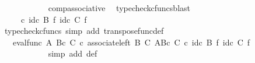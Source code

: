 \begin{isabellebody}
\ \ \ \ \ \ \ \ \ \ \isamarkupfalse%
\ comp{\isacharunderscore}{\kern0pt}associative{}\ \isamarkupfalse%
\ {\isacharparenleft}{\kern0pt}typecheck{\isacharunderscore}{\kern0pt}cfuncs{\isacharcomma}{\kern0pt}blast{\isacharparenright}{\kern0pt}\isanewline
\ \ \ \ \ \ \ \ \isamarkupfalse%
\ \isamarkupfalse%
\ {\isachardoublequoteopen}{\isachardot}{\kern0pt}{\isachardot}{\kern0pt}{\isachardot}{\kern0pt}\ {\isacharequal}{\kern0pt}\ {\isasymphi}\ \ {\isasymcirc}\isactrlsub c\ {\isacharparenleft}{\kern0pt}id\isactrlsub c\ B\ {\isasymtimes}\isactrlsub f\ {\isacharparenleft}{\kern0pt}id\isactrlsub c\ C\ {\isasymtimes}\isactrlsub f\ {\isasympsi}\isactrlsup {\isasymsharp}{\isacharparenright}{\kern0pt}{\isacharparenright}{\kern0pt}{\isachardoublequoteclose}\isanewline
\ \ \ \ \ \ \ \ \ \ \isamarkupfalse%
\ {\isacharparenleft}{\kern0pt}typecheck{\isacharunderscore}{\kern0pt}cfuncs{\isacharcomma}{\kern0pt}\ simp\ add{\isacharcolon}{\kern0pt}\ transpose{\isacharunderscore}{\kern0pt}func{\isacharunderscore}{\kern0pt}def{\isacharparenright}{\kern0pt}\isanewline
\ \ \ \ \ \ \ \ \isamarkupfalse%
\ \isamarkupfalse%
\ {\isachardoublequoteopen}{\isachardot}{\kern0pt}{\isachardot}{\kern0pt}{\isachardot}{\kern0pt}\ {\isacharequal}{\kern0pt}\ {\isacharparenleft}{\kern0pt}{\isacharparenleft}{\kern0pt}eval{\isacharunderscore}{\kern0pt}func\ A\ {\isacharparenleft}{\kern0pt}B{\isasymtimes}\isactrlsub c\ C{\isacharparenright}{\kern0pt}{\isacharparenright}{\kern0pt}\ {\isasymcirc}\isactrlsub c\ {\isacharparenleft}{\kern0pt}associate{\isacharunderscore}{\kern0pt}left\ B\ C\ {\isacharparenleft}{\kern0pt}A\isactrlbsup {\isacharparenleft}{\kern0pt}B{\isasymtimes}\isactrlsub c\ C{\isacharparenright}{\kern0pt}\isactrlesup {\isacharparenright}{\kern0pt}{\isacharparenright}{\kern0pt}{\isacharparenright}{\kern0pt}\ {\isasymcirc}\isactrlsub c\ {\isacharparenleft}{\kern0pt}id\isactrlsub c\ B\ {\isasymtimes}\isactrlsub f\ {\isacharparenleft}{\kern0pt}id\isactrlsub c\ C\ {\isasymtimes}\isactrlsub f\ {\isasympsi}\isactrlsup {\isasymsharp}{\isacharparenright}{\kern0pt}{\isacharparenright}{\kern0pt}{\isachardoublequoteclose}\isanewline
\ \ \ \ \ \ \ \ \ \ \isamarkupfalse%
\ {\isacharparenleft}{\kern0pt}simp\ add{\isacharcolon}{\kern0pt}\ {\isasymphi}{\isacharunderscore}{\kern0pt}def{\isacharparenright}{\kern0pt}\isanewline
\ \ \ \ \ \ \ \ \isamarkupfalse%
\ \isamarkupfalse%

\end{isabellebody}
